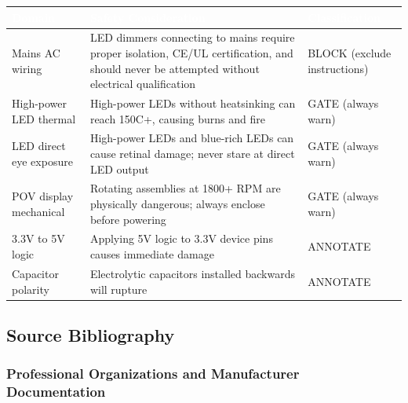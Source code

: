 \documentclass[11pt,letterpaper]{article}
\newcommand{\tableheader}[1]{\textbf{\sffamily\textcolor{white}{#1}}}
\begin{document}
\begin{center}
\begin{tabularx}{\textwidth}{L{4cm}XL{3cm}}
\toprule
{}
\tableheader{Domain} & \tableheader{Safety Consideration} & \tableheader{Classification} \\
\midrule
Mains AC wiring & LED dimmers connecting to mains require proper isolation, CE/UL certification, and should never be attempted without electrical qualification & BLOCK (exclude instructions) \\
High-power LED thermal & High-power LEDs without heatsinking can reach 150C+, causing burns and fire & GATE (always warn) \\
LED direct eye exposure & High-power LEDs and blue-rich LEDs can cause retinal damage; never stare at direct LED output & GATE (always warn) \\
POV display mechanical & Rotating assemblies at 1800+ RPM are physically dangerous; always enclose before powering & GATE (always warn) \\
3.3V to 5V logic & Applying 5V logic to 3.3V device pins causes immediate damage & ANNOTATE \\
Capacitor polarity & Electrolytic capacitors installed backwards will rupture & ANNOTATE \\
\bottomrule
\end{tabularx}
\end{center}

\subsection{Source Bibliography}

\subsubsection{Professional Organizations and Manufacturer Documentation}
\end{document}
